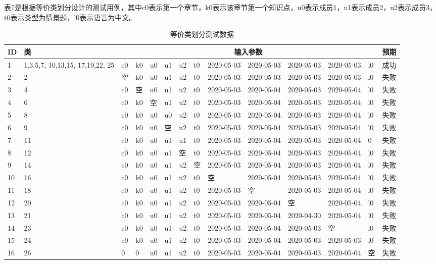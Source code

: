 \documentclass[hyperref, a4paper]{ctexart}
\begin{document}
表7是根据等价类划分设计的测试用例，其中c0表示第一个章节，k0表示该章节第一个知识点，u0表示成员1，u1表示成员2，u2表示成员3，t0表示类型为情景题，l0表示语言为中文。

\begin{table}[!htbp]
  \caption{等价类划分测试数据}
  \centering
  \begin{tabular}{|p{0.35cm}|p{1.2cm}|p{0.22cm}|p{0.22cm}|p{0.22cm}|p{0.22cm}|p{0.22cm}|p{0.22cm}|p{0.9cm}|p{0.9cm}|p{0.9cm}|p{0.9cm}|p{0.22cm}|p{0.8cm}|}
  \hline
  \textbf{ID} & \textbf{类} & \multicolumn{11}{c|}{\textbf{输入参数}} & \textbf{预期}  \\ 
  \hline
1   & 1,3,5,7, 10,13,15, 17,19,22, 25 & c0  & k0 & u0 & u1 & u2 & t0  & 2020-05-03 & 2020-05-03 & 2020-05-03 & 2020-05-03 & l0 & 成功   \\
  \hline
2   & 2  & 空 & k0  & u0 & u1 & u2 & t0  & 2020-05-03 & 2020-05-03  
& 2020-05-03 & 2020-05-03 & l0 & 失败   \\
  \hline
3   & 4  & c0 & 空 & u0 & u1 & u2 & t0  & 2020-05-03 & 2020-05-04  
& 2020-05-03 & 2020-05-04 & l0 & 失败   \\
  \hline
4   & 6  & c0 & k0  & 空 & u1 & u2 & t0  & 2020-05-03 & 2020-05-04  
& 2020-05-03 & 2020-05-04 & l0 & 失败   \\
  \hline
5   & 8  & c0 & k0  & u0 & u0 & u2 & t0  & 2020-05-03 & 2020-05-04  
& 2020-05-03 & 2020-05-04 & l0 & 失败   \\
  \hline
6   & 9  & c0 & k0  & u0 & 空 & u2 & t0  & 2020-05-03 & 2020-05-04  
& 2020-05-03 & 2020-05-04 & l0 & 失败   \\
  \hline
7   & 11 & c0 & k0  & u0 & u1 & u1 & t0  & 2020-05-03 & 2020-05-04  
& 2020-05-03 & 2020-05-04 & 0  & 失败   \\
  \hline
8   & 12 & c0 & k0  & u0 & u1 & 空 & t0  & 2020-05-03 & 2020-05-04  
& 2020-05-03 & 2020-05-04 & l0 & 失败   \\
  \hline
9   & 14 & c0 & k0  & u0 & u1 & u2 & 空  & 2020-05-03 & 2020-05-04  
& 2020-05-03 & 2020-05-04 & l0 & 失败   \\
  \hline 
10  & 16 & c0 & k0  & u0 & u1 & u2 & t0  & 空         & 2020-05-04  
& 2020-05-03 & 2020-05-04 & l0 & 失败   \\
  \hline
11  & 18 & c0 & k0  & u0 & u1 & u2 & t0  & 2020-05-03 & 空  
& 2020-05-03 & 2020-05-04 & l0 & 失败   \\
  \hline
12  & 20 & c0 & k0  & u0 & u1 & u2 & t0  & 2020-05-03 & 2020-05-04  
& 空         & 2020-05-04 & l0 & 失败   \\
  \hline
13  & 21 & c0 & k0  & u0 & u1 & u2 & t0  & 2020-05-03 & 2020-05-04  
& 2020-04-30 & 2020-05-04 & l0 & 失败   \\
  \hline
14  & 23 & c0 & k0  & u0 & u1 & u2 & t0  & 2020-05-03 & 2020-05-04  
& 2020-05-03 & 空         & l0 & 失败   \\
  \hline
15  & 24 & c0 & k0  & u0 & u1 & u2 & t0  & 2020-05-03 & 2020-05-04  
& 2020-05-03 & 2020-05-03 & l0 & 失败   \\
  \hline
16  & 26 & 0  & 0  & u0 & u1 & u2 & t0  & 2020-05-03 & 2020-05-04  
& 2020-05-03 & 2020-05-04 & 空 & 失败   \\


\end{tabular}
\end{table}
\end{document}
